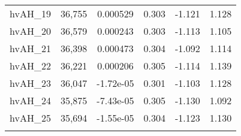 \begin{tabular}{lccccc}
hvAH\_19 & 36,755 & 0.000529 & 0.303 & -1.121 & 1.128 \\
hvAH\_20 & 36,579 & 0.000243 & 0.303 & -1.113 & 1.105 \\
hvAH\_21 & 36,398 & 0.000473 & 0.304 & -1.092 & 1.114 \\
hvAH\_22 & 36,221 & 0.000206 & 0.305 & -1.114 & 1.139 \\
hvAH\_23 & 36,047 & -1.72e-05 & 0.301 & -1.103 & 1.128 \\
hvAH\_24 & 35,875 & -7.43e-05 & 0.305 & -1.130 & 1.092 \\
hvAH\_25 & 35,694 & -1.55e-05 & 0.304 & -1.123 & 1.130 \\
 &  &  &  &  &  \\ \hline
\end{tabular}
